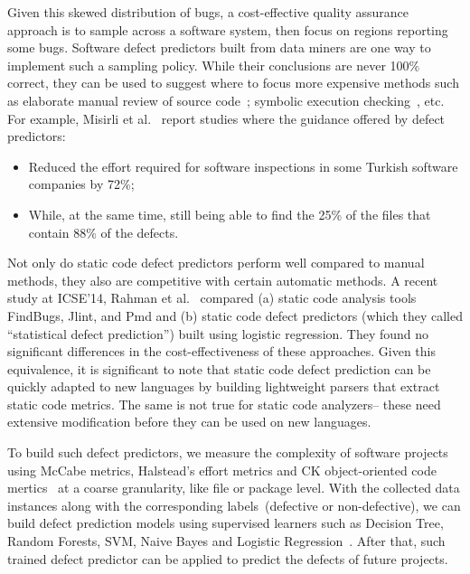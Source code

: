 \documentclass[sigconf]{acmart}
\theoremstyle{break}
\newcommand{\bi}{\begin{itemize}[leftmargin=0.4cm]}
\newcommand{\ei}{\end{itemize}}
\begin{document}
Given this skewed distribution of bugs,  a
cost-effective   quality assurance approach is to  sample
across a software system, then focus  on regions reporting some
bugs.
Software defect predictors built from data miners are 
 one way to implement such a sampling policy. While their conclusions
are never 100\% correct, they can be used to suggest where to focus more expensive  methods such as elaborate manual
review of source code~\cite{Shull:2001}; symbolic execution checking~\cite{paaareanu2008combining}, etc.
For example, Misirli et al.~\cite{misirli2011ai} report studies where the guidance offered by
defect predictors:
\bi
\item
Reduced the effort required for
software inspections in some Turkish software companies by
72\%;
\item
While, at the same time, still being able to find the 25\% of the files that
contain 88\% of the defects.
\ei
Not only do static code defect predictors perform well compared to manual methods,
they also are competitive with certain automatic methods.
A recent study at ICSE'14, Rahman et al.~\cite{rahman2014comparing} compared
(a) static code analysis tools FindBugs, Jlint, and Pmd and (b)
static code defect predictors
(which they called ``statistical defect prediction'') built using logistic regression.
They found  no significant differences in the cost-effectiveness
of these  approaches. Given this equivalence, it is significant to note that 
static code defect prediction can be quickly adapted to new languages by building lightweight
parsers that extract static code metrics. The same is not true for   static code analyzers-- these need  extensive modification before they can be used on new
languages.



To build such defect predictors,
  we measure the complexity of
software projects using McCabe metrics, Halstead's effort metrics and  CK object-oriented code mertics~\cite{kafura1987use,chidamber1994metrics,mccabe1976complexity,halstead1977elements} at
a coarse granularity, like file or package level. With the collected data instances along with the corresponding labels~(defective or non-defective), we can  build defect prediction models using supervised learners such as Decision Tree, Random Forests, SVM, Naive Bayes and Logistic Regression~\cite{khoshgoftaar2001modeling,khoshgoftaar2003software,khoshgoftaar2000balancing,menzies2007data,lessmann2008benchmarking,hall2012systematic}. After that, such trained defect predictor can be applied
to predict the defects of future projects. 
\end{document}
